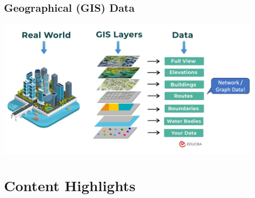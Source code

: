 \documentclass[11pt]{article}
\theoremstyle{definition}
\begin{document}
\subsection{Geographical (GIS) Data}
\includegraphics[width = \textwidth/2]{12.png}

\section{Content Highlights}
\end{document}
